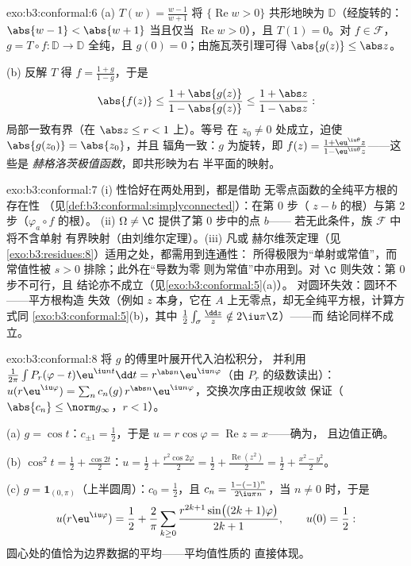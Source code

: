 \begin{solution}{exo:b3:conformal:6}
(a) $T(w) = \frac{w - 1}{w + 1}$ 将 $\{\operatorname{Re}w >
0\}$ 共形地映为 $\mathbb D$（经旋转的：$\abs{w -
1} < \abs{w + 1}$ 当且仅当 $\operatorname{Re}w > 0$），且 $T(1) =
0$。对 $f \in \mathcal F$，$g = T\circ f\colon \mathbb D \to
\mathbb D$ 全纯，且 $g(0) = 0$；由施瓦茨引理可得
$\abs{g(z)} \leq \abs z$。

(b) 反解 $T$ 得 $f = \frac{1 + g}{1 - g}$，于是
\[
\abs{f(z)} \leq \frac{1 + \abs{g(z)}}{1 - \abs{g(z)}}
\leq \frac{1 + \abs z}{1 - \abs z} :
\]
局部一致有界（在 $\abs z \leq r < 1$ 上）。等号
在 $z_0 \neq 0$ 处成立，迫使 $\abs{g(z_0)} = \abs{z_0}$，并且
辐角一致：$g$ 为旋转，即 $f(z) = \frac{1 +
\eu^{\iu\theta}z}{1 - \eu^{\iu\theta}z}$——这些是
\emph{赫格洛茨极值函数}，即共形映为右
半平面的映射。
\end{solution}

\begin{solution}{exo:b3:conformal:7}
(i) 性恰好在两处用到，都是借助
无零点函数的全纯平方根的存在性
（见\cref{def:b3:conformal:simplyconnected}）：在第 0 步（
$z - b$ 的根）与第 2 步（$\varphi_a\circ f$ 的根）。
(ii) $\Omega \neq \C$ 提供了第 0 步中的点 $b$——
若无此条件，族 $\mathcal F$ 中将不含单射
有界映射（由刘维尔定理）。(iii) 凡或
赫尔维茨定理（见\cref{exo:b3:residues:8}）适用之处，都需用到连通性：
所得极限为“单射或常值”，而
常值性被 $s > 0$ 排除；此外在“导数为零
则为常值”中亦用到。对 $\C$ 则失效：第 0 步不可行，且
结论亦不成立（见\cref{exo:b3:conformal:5}(a)）。
对圆环失效：圆环不——平方根构造
失效（例如 $z$ 本身，它在
$A$ 上无零点，却无全纯平方根，计算方式同
\cref{exo:b3:conformal:5}(b)，其中
$\frac12\int_\sigma\frac{\dd z}z \notin 2\iu\pi\Z$）——而
结论同样不成立。
\end{solution}

\begin{solution}{exo:b3:conformal:8}
将 $g$ 的傅里叶展开代入泊松积分，
并利用
$\frac1{2\pi}\int P_r(\varphi - t)\eu^{\iu nt}\dd t =
r^{\abs n}\eu^{\iu n\varphi}$（由 $P_r$ 的级数读出）：
$u(r\eu^{\iu\varphi}) = \sum_nc_n(g)\,r^{\abs
n}\eu^{\iu n\varphi}$，交换次序由正规收敛
保证（$\abs{c_n} \leq \norm g_\infty$，$r < 1$）。

(a) $g = \cos t$：$c_{\pm1} = \frac12$，于是 $u =
r\cos\varphi = \operatorname{Re}z = x$——确为，
且边值正确。

(b) $\cos^2t = \frac12 + \frac{\cos 2t}2$：$u = \frac12 +
\frac{r^2\cos2\varphi}2 = \frac12 +
\frac{\operatorname{Re}(z^2)}2 = \frac12 + \frac{x^2 -
y^2}{2}$。

(c) $g = \mathbf 1_{(0,\pi)}$（上半圆周）：$c_0 =
\frac12$，且 $c_n = \frac{1 - (-1)^n}{2\iu\pi n}$，当 $n \neq
0$ 时，于是
\[
u(r\eu^{\iu\varphi}) = \frac12 + \frac2\pi\sum_{k\geq0}
\frac{r^{2k+1}\sin\bigl((2k+1)\varphi\bigr)}{2k + 1},
\qquad u(0) = \frac12 :
\]
圆心处的值恰为边界数据的平均——平均值性质的
直接体现。
\end{solution}

